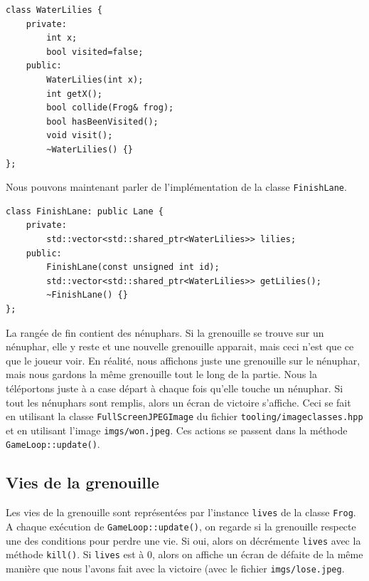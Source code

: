 \documentclass[a4paper, 12pt]{article}
\begin{document}
\begin{lstlisting}
class WaterLilies {
    private:
        int x;
        bool visited=false;
    public:
        WaterLilies(int x);
        int getX();
        bool collide(Frog& frog);
        bool hasBeenVisited();
        void visit();
        ~WaterLilies() {}
};
\end{lstlisting} \hspace{0.5cm}

Nous pouvons maintenant parler de l'implémentation de la classe \texttt{FinishLane}. \\

\begin{lstlisting}
class FinishLane: public Lane {
    private:
        std::vector<std::shared_ptr<WaterLilies>> lilies;
    public:
        FinishLane(const unsigned int id);
        std::vector<std::shared_ptr<WaterLilies>> getLilies();
        ~FinishLane() {}
};
\end{lstlisting} \hspace{0.5cm}

La rangée de fin contient des nénuphars. Si la grenouille se trouve sur un nénuphar, elle y reste et une nouvelle grenouille apparait, mais ceci n'est que ce que le joueur voir. En réalité, nous affichons juste une grenouille sur le nénuphar, mais nous gardons la même grenouille tout le long de la partie. Nous la téléportons juste à a case départ à chaque fois qu'elle touche un nénuphar. Si tout les nénuphars sont remplis, alors un écran de victoire s'affiche. Ceci se fait en utilisant la classe \texttt{FullScreenJPEGImage} du fichier \texttt{tooling/image\textunderscore classes.hpp} et en utilisant l'image \texttt{imgs/won.jpeg}. Ces actions se passent dans la méthode \texttt{GameLoop::update()}.

\subsection{Vies de la grenouille} \label{lives}

Les vies de la grenouille sont représentées par l'instance \texttt{lives} de la classe \texttt{Frog}. A chaque exécution de 
\texttt{GameLoop::update()}, on regarde si la grenouille respecte une des conditions pour perdre une vie. Si oui, alors on décrémente \texttt{lives} avec la méthode \texttt{kill()}. Si \texttt{lives} est à 0, alors on affiche un écran de défaite de la même manière que nous l'avons fait avec la victoire (avec le fichier \texttt{imgs/lose.jpeg}. \\
\end{document}
